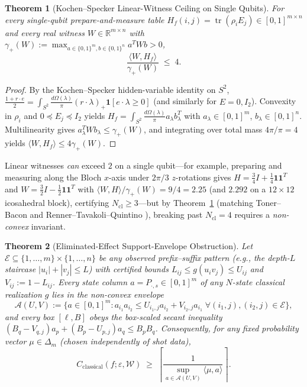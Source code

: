 \documentclass[11pt]{article}
\newtheorem{theorem}{Theorem}
\theoremstyle{definition}
\newcommand{\R}{\mathbb{R}}
\newcommand{\eps}{\varepsilon}
\newcommand{\Tr}{\operatorname{tr}}
\begin{document}
\begin{theorem}[Kochen--Specker Linear-Witness Ceiling on Single Qubits]\label{thm:kslinear}
For every single-qubit prepare-and-measure table $H_f(i,j)=\Tr(\rho_i E_j)\in[0,1]^{m\times n}$ and every real witness $W\in\R^{m\times n}$ with $\gamma_+(W):=\max_{a\in\{0,1\}^m,b\in\{0,1\}^n}a^TWb>0$,
\[
 \frac{\langle W, H_f\rangle}{\gamma_+(W)} \;\le\; 4.
\]
\end{theorem}
\begin{proof}
By the Kochen--Specker hidden-variable identity on $S^2$, $\frac{1+r\cdot e}{2}=\int_{S^2}\frac{d\Omega(\lambda)}{\pi}(r\cdot\lambda)_+\mathbf{1}[e\cdot\lambda\ge 0]$ (and similarly for $E=0,I_2$). Convexity in $\rho_i$ and $0\preceq E_j\preceq I_2$ yields $H_f=\int_{S^2}\frac{d\Omega(\lambda)}{\pi}a_\lambda b_\lambda^T$ with $a_\lambda\in[0,1]^m$, $b_\lambda\in[0,1]^n$. Multilinearity gives $a_\lambda^TWb_\lambda\le\gamma_+(W)$, and integrating over total mass $4\pi/\pi=4$ yields $\langle W,H_f\rangle\le 4\gamma_+(W)$.
\end{proof}

Linear witnesses \emph{can} exceed $2$ on a single qubit---for example, preparing and measuring along the Bloch $x$-axis under $2\pi/3$ $z$-rotations gives $H=\frac{3}{4}I+\frac{1}{4}\mathbf{1}\mathbf{1}^T$ and $W=\frac{3}{2}I-\frac{1}{2}\mathbf{1}\mathbf{1}^T$ with $\langle W,H\rangle/\gamma_+(W)=9/4=2.25$ (and $2.292$ on a $12\times 12$ icosahedral block), certifying $N_{\mathrm{cl}}\ge 3$---but by Theorem~\ref{thm:kslinear} (matching Toner--Bacon \cite{TonerBacon2003} and Renner--Tavakoli--Quintino \cite{RTQ2023}), breaking past $N_{\mathrm{cl}}=4$ requires a \emph{non-convex} invariant.

\begin{theorem}[Eliminated-Effect Support-Envelope Obstruction]\label{thm:envelope}
Let $\mathcal{E}\subseteq\{1,\dots,m\}\times\{1,\dots,n\}$ be any observed prefix--suffix pattern (e.g., the depth-$L$ staircase $|u_i|+|v_j|\le L$) with certified bounds $L_{ij}\le g(u_iv_j)\le U_{ij}$ and $V_{ij}:=1-L_{ij}$. Every state column $a=P_{\cdot,s}\in[0,1]^m$ of any $N$-state classical realization $g$ lies in the non-convex envelope
\[
 \mathcal{A}(U,V):=\bigl\{a\in[0,1]^m : a_{i_1}a_{i_2}\le U_{i_1,j}a_{i_2}+V_{i_2,j}a_{i_1}\;\forall (i_1,j),(i_2,j)\in\mathcal{E}\bigr\},
\]
and every box $[\ell,B]$ obeys the box-scaled secant inequality $(B_q-V_{q,j})a_p+(B_p-U_{p,j})a_q\le B_pB_q$. Consequently, for any fixed probability vector $\mu\in\Delta_m$ (chosen independently of shot data),
\[
 C_{\mathrm{classical}}(f;\eps,\mathcal{W}) \;\ge\; \left\lceil\frac{1}{\sup_{a\in\mathcal{A}(U,V)}\langle\mu,a\rangle}\right\rceil.
\]
\end{theorem}
\end{document}
